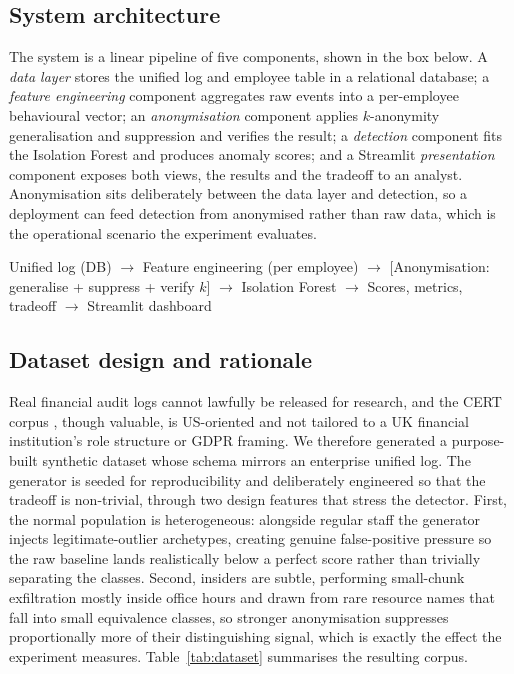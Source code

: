 \documentclass[10pt,a4paper]{article}
\begin{document}
\subsection{System architecture}
The system is a linear pipeline of five components, shown in the box below. A \emph{data layer} stores the unified log and employee table in a relational database; a \emph{feature engineering} component aggregates raw events into a per-employee behavioural vector; an \emph{anonymisation} component applies $k$-anonymity generalisation and suppression and verifies the result; a \emph{detection} component fits the Isolation Forest and produces anomaly scores; and a Streamlit \emph{presentation} component exposes both views, the results and the tradeoff to an analyst. Anonymisation sits deliberately between the data layer and detection, so a deployment can feed detection from anonymised rather than raw data, which is the operational scenario the experiment evaluates.

\begin{mdframed}[backgroundcolor=boxgrey,linewidth=0.4pt,roundcorner=3pt,innertopmargin=5pt,innerbottommargin=5pt]
{\footnotesize\ttfamily Unified log (DB) $\rightarrow$ Feature engineering (per employee) $\rightarrow$ [Anonymisation: generalise + suppress + verify $k$] $\rightarrow$ Isolation Forest $\rightarrow$ Scores, metrics, tradeoff $\rightarrow$ Streamlit dashboard}
\end{mdframed}

\subsection{Dataset design and rationale}
Real financial audit logs cannot lawfully be released for research, and the CERT corpus \cite{glasser2013}, though valuable, is US-oriented and not tailored to a UK financial institution's role structure or GDPR framing. We therefore generated a purpose-built synthetic dataset whose schema mirrors an enterprise unified log. The generator is seeded for reproducibility and deliberately engineered so that the tradeoff is non-trivial, through two design features that stress the detector. First, the normal population is heterogeneous: alongside regular staff the generator injects legitimate-outlier archetypes, creating genuine false-positive pressure so the raw baseline lands realistically below a perfect score rather than trivially separating the classes. Second, insiders are subtle, performing small-chunk exfiltration mostly inside office hours and drawn from rare resource names that fall into small equivalence classes, so stronger anonymisation suppresses proportionally more of their distinguishing signal, which is exactly the effect the experiment measures. Table~\ref{tab:dataset} summarises the resulting corpus.
\end{document}
